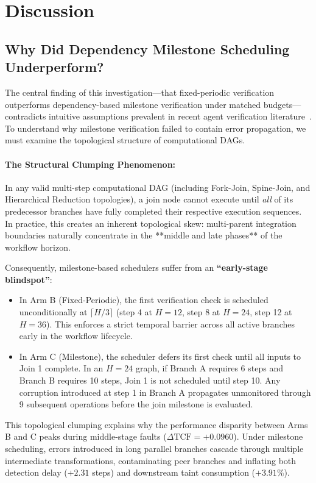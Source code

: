 \section{Discussion}
\label{sec:discussion}

\subsection{Why Did Dependency Milestone Scheduling Underperform?}
The central finding of this investigation—that fixed-periodic verification outperforms dependency-based milestone verification under matched budgets—contradicts intuitive assumptions prevalent in recent agent verification literature~\citep{afoud2026vreact}. To understand why milestone verification failed to contain error propagation, we must examine the topological structure of computational DAGs.

\paragraph{The Structural Clumping Phenomenon:}
In any valid multi-step computational DAG (including Fork-Join, Spine-Join, and Hierarchical Reduction topologies), a join node cannot execute until \emph{all} of its predecessor branches have fully completed their respective execution sequences. In practice, this creates an inherent topological skew: multi-parent integration boundaries naturally concentrate in the **middle and late phases** of the workflow horizon.

Consequently, milestone-based schedulers suffer from an \textbf{``early-stage blindspot''}:
\begin{itemize}
    \item In Arm B (Fixed-Periodic), the first verification check is scheduled unconditionally at $\lceil H/3 \rceil$ (step 4 at $H=12$, step 8 at $H=24$, step 12 at $H=36$). This enforces a strict temporal barrier across all active branches early in the workflow lifecycle.
    \item In Arm C (Milestone), the scheduler defers its first check until all inputs to Join 1 complete. In an $H=24$ graph, if Branch A requires 6 steps and Branch B requires 10 steps, Join 1 is not scheduled until step 10. Any corruption introduced at step 1 in Branch A propagates unmonitored through 9 subsequent operations before the join milestone is evaluated.
\end{itemize}

This topological clumping explains why the performance disparity between Arms B and C peaks during middle-stage faults ($\Delta \text{TCF} = +0.0960$). Under milestone scheduling, errors introduced in long parallel branches cascade through multiple intermediate transformations, contaminating peer branches and inflating both detection delay ($+2.31$ steps) and downstream taint consumption ($+3.91\%$).

